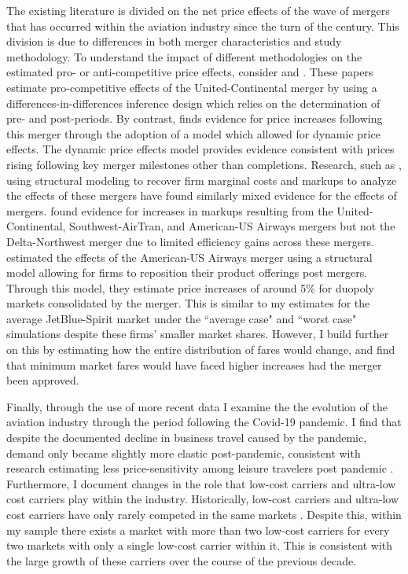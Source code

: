 \documentclass{article}
\begin{document}
    The existing literature is divided on the net price effects of the wave of mergers that has occurred within the aviation industry since the turn of the century. This division is due to differences in both merger characteristics and study methodology. To understand the impact of different methodologies on the estimated pro- or anti-competitive price effects, consider \citet{luo_price_2014} and \citet{carlton_are_2019}. These papers estimate pro-competitive effects of the United-Continental merger by using a differences-in-differences inference design which relies on the determination of pre- and post-periods. By contrast, \citet{fan_when_2020} finds evidence for price increases following this merger through the adoption of a model which allowed for dynamic price effects. The dynamic price effects model provides  evidence consistent with prices rising following key merger milestones other than completions. Research, such as \citet{bet_retrospective_2021, ciliberto_market_2021}, using structural modeling to recover firm marginal costs and markups to analyze the effects of these mergers have found similarly mixed evidence for the effects of mergers. \citet{bet_retrospective_2021} found evidence for increases in markups resulting from the United-Continental, Southwest-AirTran, and American-US Airways mergers but not the Delta-Northwest merger due to limited efficiency gains across these mergers. \citet{ciliberto_market_2021} estimated the effects of the American-US Airways merger using a structural model allowing for firms to reposition their product offerings post mergers. Through this model, they estimate price increases of around 5\% for duopoly markets consolidated by the merger. This is similar to my estimates for the average JetBlue-Spirit market under the ``average case" and ``worst case" simulations despite these firms' smaller market shares. However, I build further on this by estimating how the entire distribution of fares would change, and find that minimum market fares would have faced higher increases had the merger been approved. %


    Finally, through the use of more recent data I examine the the evolution of the aviation industry through the period following the Covid-19 pandemic. I find that despite the documented decline in business travel caused by the pandemic, demand only became slightly more elastic post-pandemic, consistent with research estimating less price-sensitivity among leisure travelers post pandemic \citep{ewen_zoom_2023}. Furthermore, I document changes in the role that low-cost carriers and ultra-low cost carriers play within the industry. Historically, low-cost carriers and ultra-low cost carriers have only rarely competed in the same markets \citep{ciliberto_market_2021}. Despite this, within my sample there exists a market with more than two low-cost carriers for every two markets with only a single low-cost carrier within it. This is consistent with the large growth of these carriers over the course of the previous decade.
    
\end{document}
